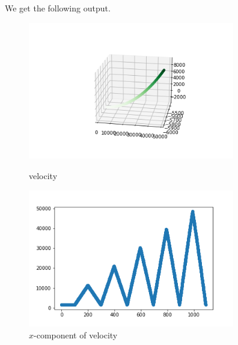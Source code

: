 \documentclass[12pt]{article}
\begin{document}
We get the following output.
\begin{figure}[H]
	\begin{multicols}{2}
		\includegraphics[width=\linewidth, height=6cm]{vs1.png} \caption{velocity} \label{vs1} \par
		\includegraphics[width=\linewidth, height=6cm]{vsx1.png} \caption{$x$-component of velocity} \label{vsx1} \par
	\end{multicols}
\end{figure}
\end{document}
